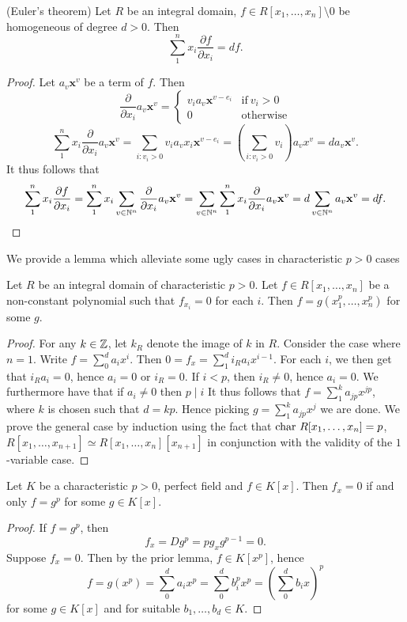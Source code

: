 \begin{lemma}\label{EulersTheorem}(Euler's theorem)
    Let $R$ be an integral domain, $f\in R[x_1,\dots,x_n]\setminus0 $ be homogeneous of degree $d>0$. Then
    $$\sum_1^n x_i\frac{\partial f}{\partial x_i}=df.$$
\end{lemma}
\begin{proof}
    Let $a_v\mathbf{x}^v$ be a term of $f$. Then
    $$\frac{\partial }{\partial x_i} a_v\mathbf{x}^v = \begin{cases}
        v_ia_v\mathbf{x}^{v-e_i} & \mathrm{if} \ v_i>0\\
        0 & \mathrm{otherwise}
    \end{cases}$$
    $$\sum_1^n x_i\frac{\partial }{\partial x_i} a_v\mathbf{x}^v = \sum_{i: v_i>0} v_ia_vx_i \mathbf{x}^{v-e_i} = \left(\sum_{i : v_i>0} v_i\right) a_vx^{v} = da_v\mathbf{x}^v.$$
    It thus follows that 
    $$\sum_1^n x_i\frac{\partial f}{\partial x_i}= \sum_1^n x_i\sum_{v\in\mathbb{N}^n}\frac{\partial}{\partial x_i}a_v\mathbf{x}^v = \sum_{v\in\mathbb{N}^n} \sum_1^n x_i\frac{\partial}{\partial x_i}a_v\mathbf{x}^v=d\sum_{v\in\mathbb{N}^n} a_v\mathbf{x}^v=d f. $$
\end{proof}
We provide a lemma which alleviate some ugly cases in characteristic $p>0$ cases
\begin{lemma}\label{UsefulPartialDerivativeLemmaForPositiveCharacteristic}
    Let $R$ be an integral domain of characteristic $p>0$. Let $f\in R[x_1,\dots,x_n]$ be a non-constant polynomial such that $f_{x_i}=0$ for each $i$. Then $f=g(x_1^p,\dots,x_n^p)$ for some $g$. 
\end{lemma}
\begin{proof}
    For any $k\in \mathbb{Z}$, let $k_R$ denote the image of $k$ in $R$. Consider the case where $n=1$. Write $f=\sum_0^d a_ix^i$. Then $0=f_x = \sum_1^{d} i_Ra_ix^{i-1}.$ For each $i$, we then get that $i_Ra_i=0$, hence $a_i=0$ or $i_R=0$. If $i < p$, then $i_R\neq 0$, hence $a_i =0$. We furthermore have that if $a_i\neq 0$ then $p\mid i$ It thus follows that $f = \sum_{1}^k a_{jp} x^{jp}$, where $k$ is chosen such that $d = kp$. Hence picking $g = \sum_1^k a_{jp} x^{j}$ we are done. We prove the general case by induction using the fact that $\mathrm{char}\ R[x_1,\dots,x_n] = p$, $R[x_1,\dots,x_{n+1}]\simeq R[x_1,\dots,x_n][x_{n+1}]$ in conjunction with the validity of the $1$-variable case.   
\end{proof}
\begin{lemma}\label{ConditionForVanishingDerivativeForPolynomialOverPerfectField}
    Let $K$ be a characteristic $p>0$, perfect field and $f\in K[x]$. Then $f_x = 0$ if and only $f = g^p$ for some $g\in K[x]$.  
\end{lemma}
\begin{proof}
    If $f = g^p$, then 
    $$
        f_x = Dg^p = p g_x g^{p-1}=0.
    $$
    Suppose $f_x = 0$. Then by the prior lemma, $f \in K[x^p]$, hence 
    $$
        f = g(x^p) = \sum_0^d a_i x^p= \sum_0^d b_i^px^p = \left(\sum_0^d b_ix\right)^p 
    $$
    for some $g\in K[x]$ and for suitable $b_1,\dots,b_d\in K$. 
\end{proof}

